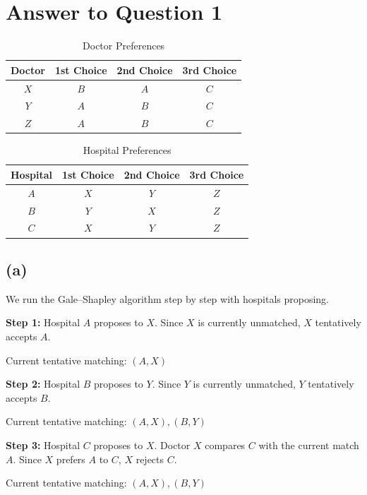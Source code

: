 \documentclass{brockcosc3p03}
\begin{document}
\section*{Answer to Question 1}

\begin{table}[H]
\centering
\caption{Doctor Preferences}
\begin{tabular}{|c|c|c|c|}
\hline
\textbf{Doctor} & \textbf{1st Choice} & \textbf{2nd Choice} & \textbf{3rd Choice} \\
\hline
$X$ & $B$ & $A$ & $C$ \\
$Y$ & $A$ & $B$ & $C$ \\
$Z$ & $A$ & $B$ & $C$ \\
\hline
\end{tabular}
\end{table}

\begin{table}[H]
\centering
\caption{Hospital Preferences}
\begin{tabular}{|c|c|c|c|}
\hline
\textbf{Hospital} & \textbf{1st Choice} & \textbf{2nd Choice} & \textbf{3rd Choice} \\
\hline
$A$ & $X$ & $Y$ & $Z$ \\
$B$ & $Y$ & $X$ & $Z$ \\
$C$ & $X$ & $Y$ & $Z$ \\
\hline
\end{tabular}
\end{table}

\subsection*{(a)}

We run the Gale--Shapley algorithm step by step with hospitals proposing.

\textbf{Step 1:} Hospital $A$ proposes to $X$. Since $X$ is currently unmatched, $X$ tentatively accepts $A$.

Current tentative matching: $(A,X)$

\textbf{Step 2:} Hospital $B$ proposes to $Y$. Since $Y$ is currently unmatched, $Y$ tentatively accepts $B$.

Current tentative matching: $(A,X), (B,Y)$

\textbf{Step 3:} Hospital $C$ proposes to $X$. Doctor $X$ compares $C$ with the current match $A$. Since $X$ prefers $A$ to $C$, $X$ rejects $C$.

Current tentative matching: $(A,X), (B,Y)$
\end{document}
